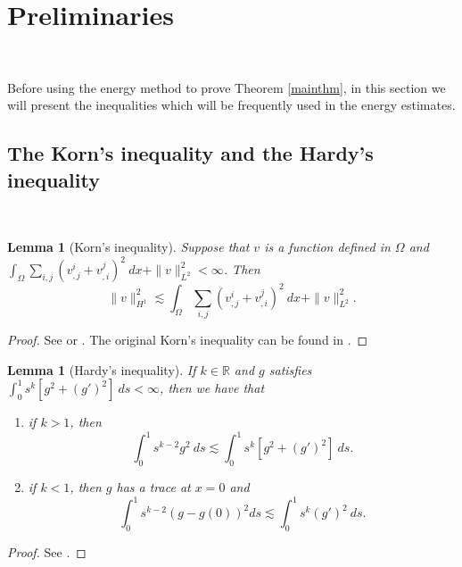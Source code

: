 \documentclass[12pt,a4paper]{amsart}
\numberwithin{equation}{section}
\theoremstyle{plain}
\newtheorem{Lem}[Thm]{Lemma}
\theoremstyle{definition}
\begin{document}
\vspace{0.7cm}
\section{Preliminaries}~

Before using the energy method to prove Theorem \ref{mainthm}, in this section we will present the inequalities which will be frequently used in the energy estimates.
\vspace{0.3cm}

\subsection{The Korn's inequality and the Hardy's inequality}~



\begin{Lem}[Korn's inequality]
	Suppose that $v$ is a function defined in $\Omega$ and $\int_{\Omega} \sum\limits_{i,j}(v^i_{,j} +v^j_{,i})^2\ dx+\|v\|_{L^2}^2<\infty$. Then 
\begin{equation}\label{Korn}
\|v\|_{H^1}^2\lesssim \int_{\Omega} \sum\limits_{i,j}(v^i_{,j} +v^j_{,i})^2\ dx+\|v\|_{L^2}^2.
\end{equation}
\end{Lem}
\begin{proof}
	See \cite[Theorem~2.1]{Ciarlet2010} or \cite[Lemma~5.1]{Zajaczkowski1993}. The original Korn's inequality can be found in \cite{Friedrichs1947}.
\end{proof}

\begin{Lem}[Hardy's inequality]
If $k\in \mathbb{R}$ and $g$ satisfies $\int_{0}^{1} s^k[g^2+(g')^2]\ ds<\infty$, then we have that
\begin{enumerate}
\item[(1)] if $k>1$, then
\begin{equation}
\int_{0}^{1}s^{k-2}g^2 \ ds\lesssim  \int_{0}^{1}s^k[g^2+(g')^2]\ ds.
\end{equation}
\item[(2)] if $k<1$, then  $g$ has a trace at $x=0$ and
\begin{equation}
\int_{0}^{1} s^{k-2} (g-g(0))^2 ds \lesssim \int_{0}^{1} s^k(g')^2 \ ds.
\end{equation}
\end{enumerate}
\end{Lem}
\begin{proof}
	See \cite[Lemma~4.2]{Jang2014}.
\end{proof}
\end{document}
